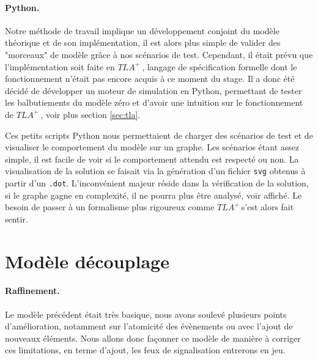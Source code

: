 \documentclass[oneside, a4paper, 11pt]{book}
\newcommand{\TLA}{\ensuremath{TLA^+~}}
\begin{document}
\paragraph{Python.}
Notre méthode de travail implique un développement conjoint du modèle théorique et de son implémentation, il est alors plus simple de valider des "morceaux" de modèle grâce à nos scénarios de test.
Cependant, il était prévu que l'implémentation soit faite en \TLA, langage de spécification formelle dont le fonctionnement n'était pas encore acquis à ce moment du stage.
Il a donc été décidé de développer un moteur de simulation en Python, permettant de tester les balbutiements du modèle zéro et d'avoir une intuition sur le fonctionnement de \TLA, voir plus section \ref{sec:tla}.


\begin{figure}
\end{figure}


Ces petits scripts Python nous permettaient de charger des scénarios de test et de visualiser le comportement du modèle sur un graphe. Les scénarios étant assez simple, il est facile de voir si le comportement attendu est respecté ou non.
La visualisation de la solution se faisait via la génération d'un fichier \texttt{svg} obtenus à partir d'un \texttt{.dot}. L'inconvénient majeur réside dans la vérification de la solution, si le graphe gagne en complexité, il ne pourra plus être analysé, voir affiché.
Le besoin de passer à un formalisme plus rigoureux comme \TLA s'est alors fait sentir.












\section{Modèle découplage}

\paragraph{Raffinement.} Le modèle précédent était très basique, nous avons soulevé plusieurs points d'amélioration, notamment sur l'atomicité des évènements ou avec l'ajout de nouveaux éléments. Nous allons donc façonner ce modèle de manière à corriger ces limitations, en terme d'ajout, les feux de signalisation entrerons en jeu.
\end{document}
